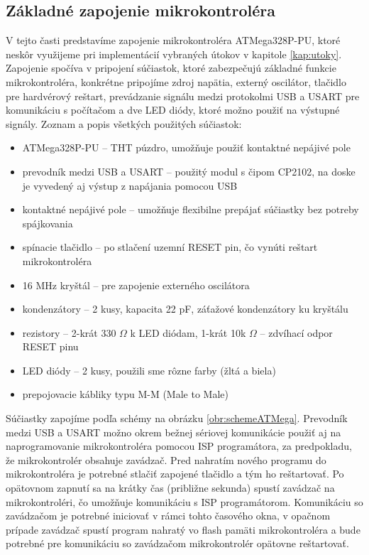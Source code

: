 \subsection{Základné zapojenie mikrokontroléra}
V tejto časti predstavíme zapojenie mikrokontroléra ATMega328P-PU, ktoré neskôr využijeme pri implementácií vybraných útokov v kapitole \ref{kap:utoky}. Zapojenie spočíva v pripojení súčiastok, ktoré zabezpečujú základné funkcie mikrokontroléra, konkrétne pripojíme zdroj napätia, externý oscilátor, tlačidlo pre hardvérový reštart, prevádzanie signálu medzi protokolmi USB a USART pre komunikáciu s počítačom a dve LED diódy, ktoré možno použiť na výstupné signály. Zoznam a popis všetkých použitých súčiastok:
\begin{itemize}
    \item ATMega328P-PU -- THT púzdro, umožňuje použiť kontaktné nepájivé pole
    \item prevodník medzi USB a USART -- použitý modul s čipom CP2102, na doske je vyvedený aj výstup z napájania pomocou USB
    \item kontaktné nepájivé pole -- umožňuje flexibilne prepájať súčiastky bez potreby spájkovania
    \item spínacie tlačidlo -- po stlačení uzemní RESET pin, čo vynúti reštart mikrokontroléra
    \item 16 MHz kryštál -- pre zapojenie externého oscilátora
    \item kondenzátory -- 2 kusy, kapacita 22 pF, záťažové kondenzátory ku kryštálu
    \item rezistory -- 2-krát 330 $\Omega$ k LED diódam, 1-krát 10k $\Omega$ -- zdvíhací odpor RESET pinu
    \item LED diódy -- 2 kusy, použili sme rôzne farby (žltá a biela)
    \item prepojovacie kábliky typu M-M (Male to Male)
\end{itemize}
Súčiastky zapojíme podľa schémy na obrázku \ref{obr:schemeATMega}. Prevodník medzi USB a USART možno okrem bežnej sériovej komunikácie použiť aj na naprogramovanie mikrokontroléra pomocou ISP programátora, za predpokladu, že mikrokontrolér obsahuje zavádzač. Pred nahratím nového programu do mikrokontroléra je potrebné stlačiť zapojené tlačidlo a tým ho reštartovať. Po opätovnom zapnutí sa na krátky čas (približne sekunda) spustí zavádzač na mikrokontroléri, čo umožňuje komunikáciu s ISP programátorom. Komunikáciu so zavádzačom je potrebné iniciovať v rámci tohto časového okna, v opačnom prípade zavádzač spustí program nahratý vo flash pamäti mikrokontroléra a bude potrebné pre komunikáciu so zavádzačom mikrokontrolér opätovne reštartovať.


